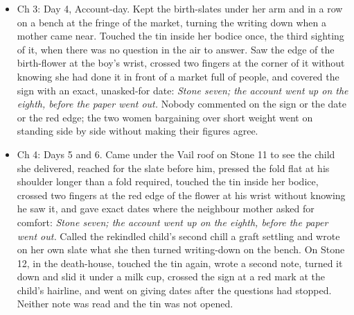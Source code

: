 \documentclass{design/chronicle}
\begin{document}
{\begin{itemize}[leftmargin=1.4em,itemsep=1pt,topsep=3pt,parsep=0pt]
\item Ch 3: Day 4, Account-day. Kept the birth-slates under her arm and in a row on a bench at the fringe of the market, turning the writing down when a mother came near. Touched the tin inside her bodice once, the third sighting of it, when there was no question in the air to answer. Saw the edge of the birth-flower at the boy’s wrist, crossed two fingers at the corner of it without knowing she had done it in front of a market full of people, and covered the sign with an exact, unasked-for date: \emph{Stone seven; the account went up on the eighth, before the paper went out.} Nobody commented on the sign or the date or the red edge; the two women bargaining over short weight went on standing side by side without making their figures agree.

\end{itemize}

\begin{itemize}[leftmargin=1.4em,itemsep=1pt,topsep=3pt,parsep=0pt]

\item Ch 4: Days 5 and 6. Came under the Vail roof on Stone 11 to see the child she delivered, reached for the slate before him, pressed the fold flat at his shoulder longer than a fold required, touched the tin inside her bodice, crossed two fingers at the red edge of the flower at his wrist without knowing he saw it, and gave exact dates where the neighbour mother asked for comfort: \emph{Stone seven; the account went up on the eighth, before the paper went out.} Called the rekindled child’s second chill a graft settling and wrote on her own slate what she then turned writing-down on the bench. On Stone 12, in the death-house, touched the tin again, wrote a second note, turned it down and slid it under a milk cup, crossed the sign at a red mark at the child’s hairline, and went on giving dates after the questions had stopped. Neither note was read and the tin was not opened.

\end{itemize}

\begin{itemize}[leftmargin=1.4em,itemsep=1pt,topsep=3pt,parsep=0pt]


\end{itemize}}
\end{document}
